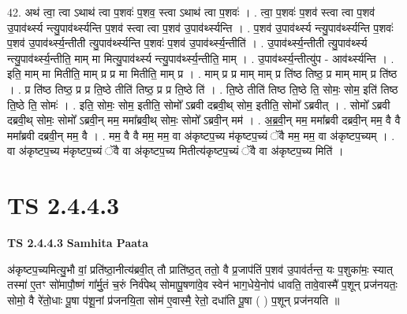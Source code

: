 \documentclass[17pt]{extarticle}
\begin{document}
42. अथ॑ त्वा॒ त्वा ऽथाथ॑ त्वा प॒शवः॑ प॒शव॒ स्त्वा ऽथाथ॑ त्वा प॒शवः॑ । . त्वा॒ प॒शवः॑ प॒शव॑ स्त्वा त्वा प॒शव॑ उ॒पाव॑र्थ्स्य न्त्यु॒पाव॑र्थ्स्यन्ति प॒शव॑ स्त्वा त्वा प॒शव॑ उ॒पाव॑र्थ्स्यन्ति । . प॒शव॑ उ॒पाव॑र्थ्स्य न्त्यु॒पाव॑र्थ्स्यन्ति प॒शवः॑ प॒शव॑ उ॒पाव॑र्थ्स्य॒न्तीती त्यु॒पाव॑र्थ्स्यन्ति प॒शवः॑ प॒शव॑ उ॒पाव॑र्थ्स्य॒न्तीति॑ । . उ॒पाव॑र्थ्स्य॒न्तीती त्यु॒पाव॑र्थ्स्य न्त्यु॒पाव॑र्थ्स्य॒न्तीति॒ माम् मा मित्यु॒पाव॑र्थ्स्य न्त्यु॒पाव॑र्थ्स्य॒न्तीति॒ माम् । . उ॒पाव॑र्थ्स्य॒न्तीत्यु॑प - आव॑र्थ्स्यन्ति । . इति॒ माम् मा मितीति॒ माम् प्र प्र मा मितीति॒ माम् प्र । . माम् प्र प्र माम् माम् प्र ति॑ष्ठ तिष्ठ॒ प्र माम् माम् प्र ति॑ष्ठ । . प्र ति॑ष्ठ तिष्ठ॒ प्र प्र ति॒ष्ठे तीति॑ तिष्ठ॒ प्र प्र ति॒ष्ठे ति॑ । . ति॒ष्ठे तीति॑ तिष्ठ ति॒ष्ठे ति॒ सोमः॒ सोम॒ इति॑ तिष्ठ ति॒ष्ठे ति॒ सोमः॑ । . इति॒ सोमः॒ सोम॒ इतीति॒ सोमो᳚ ऽब्रवी दब्रवी॒थ् सोम॒ इतीति॒ सोमो᳚ ऽब्रवीत् । . सोमो᳚ ऽब्रवी दब्रवी॒थ् सोमः॒ सोमो᳚ ऽब्रवी॒न् मम॒ ममा᳚ब्रवी॒थ् सोमः॒ सोमो᳚ ऽब्रवी॒न् मम॑ । . अ॒ब्र॒वी॒न् मम॒ ममा᳚ब्रवी दब्रवी॒न् मम॒ वै वै ममा᳚ब्रवी दब्रवी॒न् मम॒ वै । . मम॒ वै वै मम॒ मम॒ वा अ॑कृष्टप॒च्य म॑कृष्टप॒च्यं ॅवै मम॒ मम॒ वा अ॑कृष्टप॒च्यम् । . वा अ॑कृष्टप॒च्य म॑कृष्टप॒च्यं ॅवै वा अ॑कृष्टप॒च्य मितीत्य॑कृष्टप॒च्यं ॅवै वा अ॑कृष्टप॒च्य मिति॑ । \newline
\pagebreak
{}

\section{ TS 2.4.4.3 }

\textbf{TS 2.4.4.3 } \newline
\textbf{Samhita Paata} \newline

अ॑कृष्टप॒च्यमित्यु॒भौ वां॒ प्रति॑ष्ठा॒नीत्य॑ब्रवी॒त् तौ प्राति॑ष्ठ॒त् ततो॒ वै प्र॒जाप॑तिं प॒शव॑ उ॒पाव॑र्तन्त॒ यः प॒शुका॑मः॒ स्यात् तस्मा॑ ए॒तꣳ सो॑मापौ॒ष्णं गा᳚र्मु॒तं च॒रुं निर्व॑पेथ् सोमापू॒षणा॑वे॒व स्वेन॑ भाग॒धेये॒नोप॑ धावति॒ तावे॒वास्मै॑ प॒शून् प्रज॑नयतः॒ सोमो॒ वै रे॑तो॒धाः पू॒षा प॑शू॒नां प्र॑जनयि॒ता सोम॑ ए॒वास्मै॒ रेतो॒ दधा॑ति पू॒षा ( ) प॒शून् प्रज॑नयति ॥ \newline
\end{document}
